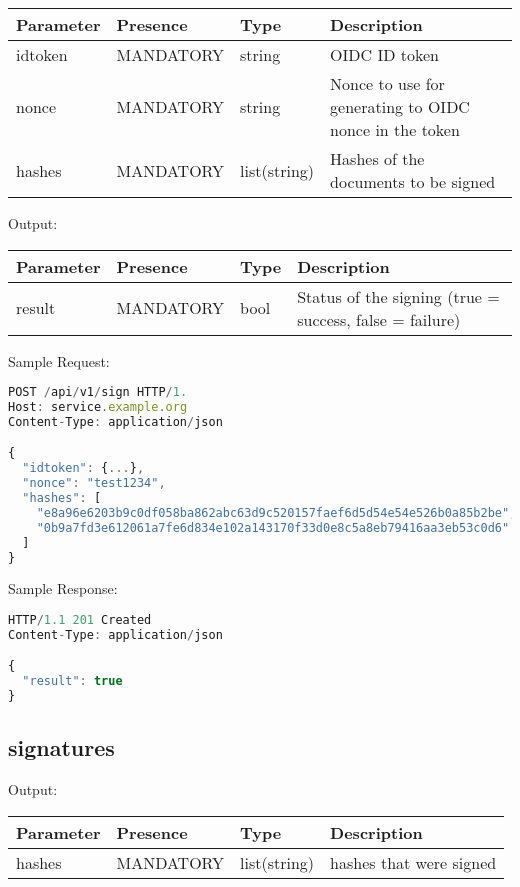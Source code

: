 \begin{tabular}{|l|l|l|l|}
	\hline
	Parameter & Presence & Type & Description \\ \hline
	idtoken & MANDATORY & string & OIDC ID token \\ \hline
	nonce & MANDATORY & string & Nonce to use for generating to OIDC nonce in the token \\ \hline
	hashes & MANDATORY & list(string) & Hashes of the documents to be signed \\ \hline
\end{tabular}

Output:

\begin{tabular}{|l|l|l|l|}
	\hline
	Parameter & Presence & Type & Description \\ \hline
	result & MANDATORY & bool & Status of the signing (true = success, false = failure) \\ \hline
\end{tabular}

Sample Request:
\begin{lstlisting}[caption={sign request}, captionpos=b, language=JavaScript, label={lst:signrequest}]
POST /api/v1/sign HTTP/1.
Host: service.example.org
Content-Type: application/json

{
  "idtoken": {...},
  "nonce": "test1234",
  "hashes": [
    "e8a96e6203b9c0df058ba862abc63d9c520157faef6d5d54e54e526b0a85b2be",
    "0b9a7fd3e612061a7fe6d834e102a143170f33d0e8c5a8eb79416aa3eb53c0d6"
  ]
}
\end{lstlisting}

Sample Response:

\begin{lstlisting}[caption={sign response}, captionpos=b, language=JavaScript, label={lst:signresponse}]
HTTP/1.1 201 Created
Content-Type: application/json

{
  "result": true
}
\end{lstlisting}

\subsection{signatures}
Output:

\begin{tabular}{|l|l|l|l|}
	\hline
	Parameter & Presence & Type & Description \\ \hline
	hashes & MANDATORY & list(string) & hashes that were signed \\ \hline
\end{tabular}

